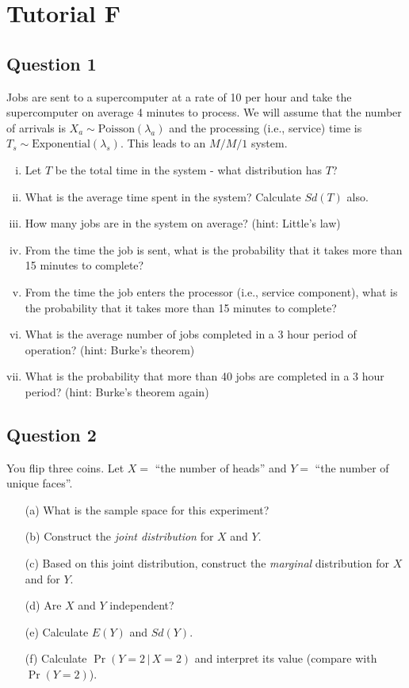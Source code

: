 \documentclass[]{report}
\begin{document}
\section{Tutorial F}

\subsection*{Question 1}
Jobs are sent to a supercomputer at a rate of 10 per hour and take the supercomputer on average 4 minutes to process. We will assume that the number of arrivals is $X_a \sim \text{Poisson}(\lambda_a)$ and the processing (i.e., service) time is $T_s \sim \text{Exponential}(\lambda_s)$. This leads to an $M/M/1$ system.\\[-0.2cm]

\begin{enumerate}[(i)]
\item Let $T$ be the total time in the system - what distribution has $T$? \item What is the average time spent in the system? Calculate $Sd(T)$ also. \item How many jobs are in the system on average? (hint: Little's law)  \item From the time the job is sent, what is the probability that it takes more than 15 minutes to complete? \item  From the time the job enters the processor (i.e., service component), what is the probability that it takes more than 15 minutes to complete? \item What is the average number of jobs completed in a 3 hour period of operation? (hint: Burke's theorem) \item What is the probability that more than 40 jobs are completed in a 3 hour period? (hint: Burke's theorem again)
\end{enumerate}








\subsection*{Question 2}
You flip three coins. Let $X = $ ``the number of heads'' and $Y = $ ``the number of unique faces''.\\[-0.2cm]
\begin{itemize}
\item[(a)] What is the sample space for this experiment?  \item[(b)] Construct the \emph{joint distribution} for $X$ and $Y$.  
\item[(c)] Based on this joint distribution, construct the \emph{marginal} distribution for $X$ and for $Y$.  
\item[(d)] Are $X$ and $Y$ independent?  
\item[(e)] Calculate $E(Y)$ and $Sd(Y)$.  
\item[(f)] Calculate $\Pr(Y=2\,|\,X=2)$ and interpret its value (compare with $\Pr(Y=2)$).
\end{itemize}
\end{document}
